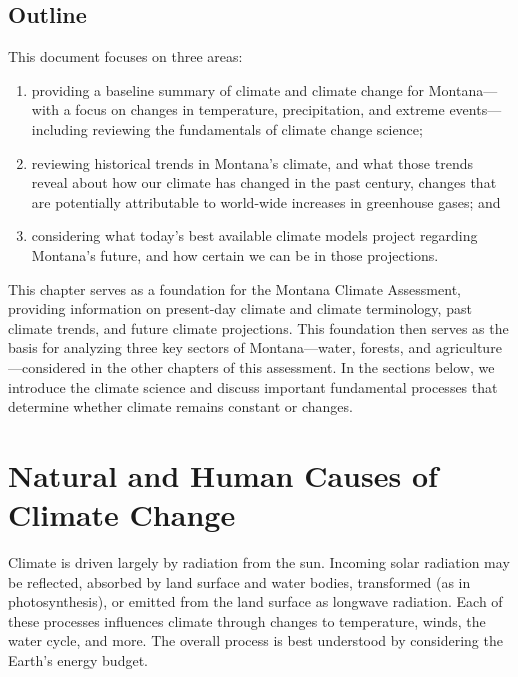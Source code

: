 \documentclass[
  letterpaper,
]{scrreprt}\usepackage{amsmath,amssymb}
\begin{document}
\hypertarget{outline}{%
\section*{Outline}\label{outline}}

This document focuses on three areas:

\begin{enumerate}
\def\labelenumi{\arabic{enumi}.}
\item
  providing a baseline summary of climate and climate change for
  Montana---with a focus on changes in temperature, precipitation, and
  extreme events---including reviewing the fundamentals of climate
  change science;
\item
  reviewing historical trends in Montana's climate, and what those
  trends reveal about how our climate has changed in the past century,
  changes that are potentially attributable to world-wide increases in
  greenhouse gases; and
\item
  considering what today's best available climate models project
  regarding Montana's future, and how certain we can be in those
  projections.
\end{enumerate}

This chapter serves as a foundation for the Montana Climate Assessment,
providing information on present-day climate and climate terminology,
past climate trends, and future climate projections. This foundation
then serves as the basis for analyzing three key sectors of
Montana---water, forests, and agriculture---considered in the other
chapters of this assessment. In the sections below, we introduce the
climate science and discuss important fundamental processes that
determine whether climate remains constant or changes.

\hypertarget{natural-and-human-causes-of-climate-change}{%
\chapter{Natural and Human Causes of Climate
Change}\label{natural-and-human-causes-of-climate-change}}

Climate is driven largely by radiation from the sun. Incoming solar
radiation may be reflected, absorbed by land surface and water bodies,
transformed (as in photosynthesis), or emitted from the land surface as
longwave radiation. Each of these processes influences climate through
changes to temperature, winds, the water cycle, and more. The overall
process is best understood by considering the Earth's energy budget.
\end{document}
